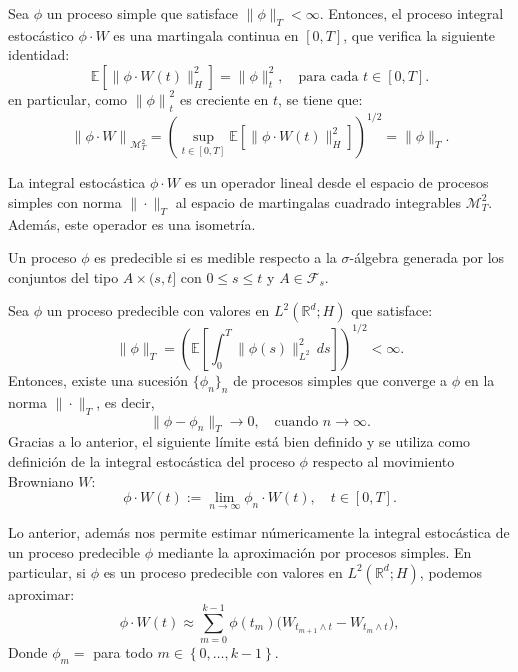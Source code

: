 \begin{prop}[]
  Sea $\phi$ un proceso simple que satisface $\|\phi\|_T < \infty$. Entonces, el proceso integral estocástico $\phi \cdot W$ es una martingala continua en $[0,T]$, que verifica la siguiente identidad:
  \[
    \mathbb{E}\left[\|\phi \cdot W(t)\|_H^2\right] = \|\phi\|_t^2, \quad \text{para cada } t \in [0,T].
  \]
  en particular, como $\left\|\phi\right\|_t^2$ es creciente en $t$, se tiene que:
  \[
    \left\|\phi \cdot W\right\|_{\mathcal{M}_T^2} = \left(\sup_{t \in [0, T]}\mathbb{E}\left[\|\phi \cdot W(t)\|_H^2\right]\right)^{1/2} = \|\phi\|_T.
  \]
\end{prop}

\begin{obs}[]
  La integral estocástica $\phi \cdot W$ es un operador lineal desde el espacio de procesos simples con norma $\|\cdot\|_T$ al espacio de martingalas cuadrado integrables $\mathcal{M}_T^2$. Además, este operador es una isometría.
\end{obs}

\begin{defn}
  Un proceso $\phi$ es predecible si es medible respecto a la $\sigma$-álgebra generada por los conjuntos del tipo $A \times (s,t]$ con $0 \leq s \leq t$ y $A \in \mathcal{F}_s$.
\end{defn}

\begin{prop}
  Sea $\phi$ un proceso predecible con valores en $L^2(\mathbb{R}^d; H)$ que satisface:
  \[
    \|\phi\|_T = \left(\mathbb{E}\left[\int_0^T \|\phi(s)\|_{L^2}^2\, ds\right]\right)^{1/2} < \infty.
  \]
  Entonces, existe una sucesión $\{\phi_n\}_n$ de procesos simples que converge a $\phi$ en la norma $\|\cdot\|_T$, es decir,
  \[
    \|\phi - \phi_n\|_T \rightarrow 0, \quad \text{cuando } n \rightarrow \infty.
  \]
  Gracias a lo anterior, el siguiente límite está bien definido y se utiliza como definición de la integral estocástica del proceso $\phi$ respecto al movimiento Browniano $W$:
  \[
    \phi \cdot W(t) := \lim_{n \rightarrow \infty}\phi_n \cdot W(t), \quad t \in [0,T].
  \]
\end{prop}

\begin{obs}[]
  Lo anterior, además nos permite estimar númericamente la integral estocástica de un proceso predecible $\phi$ mediante la aproximación por procesos simples. En particular, si $\phi$ es un proceso predecible con valores en $L^2(\mathbb{R}^d; H)$, podemos aproximar:
  \[
    \phi \cdot W(t) \approx \sum_{m=0}^{k-1} \phi(t_m)\bigl(W_{t_{m+1} \wedge t} - W_{t_m \wedge t}\bigr),
  \]
  Donde $\phi_m = $ para todo $m \in \left\{0, \ldots, k-1\right\}$.
\end{obs}

